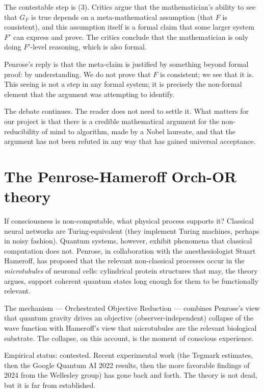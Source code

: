 \documentclass[11pt,a4paper]{book}
\theoremstyle{cleanrm}
\begin{document}
The contestable step is (3). Critics argue that the mathematician's
ability to see that $G_F$ is true depends on a meta-mathematical
assumption (that $F$ is consistent), and this assumption itself is
a formal claim that some larger system $F'$ can express and prove.
The critics conclude that the mathematician is only doing $F'$-level
reasoning, which is also formal.

Penrose's reply is that the meta-claim is justified by something
beyond formal proof: by understanding. We do not prove that $F$ is
consistent; we see that it is. This seeing is not a step in any
formal system; it is precisely the non-formal element that the
argument was attempting to identify.

The debate continues. The reader does not need to settle it. What
matters for our project is that there is a credible mathematical
argument for the non-reducibility of mind to algorithm, made by a
Nobel laureate, and that the argument has not been refuted in any
way that has gained universal acceptance.

\section{The Penrose-Hameroff Orch-OR theory}

If consciousness is non-computable, what physical process supports
it? Classical neural networks are Turing-equivalent (they implement
Turing machines, perhaps in noisy fashion). Quantum systems, however,
exhibit phenomena that classical computation does not. Penrose, in
collaboration with the anesthesiologist Stuart Hameroff, has proposed
that the relevant non-classical processes occur in the
\emph{microtubules} of neuronal cells: cylindrical protein structures
that may, the theory argues, support coherent quantum states long
enough for them to be functionally relevant.

The mechanism --- Orchestrated Objective Reduction --- combines
Penrose's view that quantum gravity drives an objective
(observer-independent) collapse of the wave function with Hameroff's
view that microtubules are the relevant biological substrate. The
collapse, on this account, is the moment of conscious experience.

Empirical status: contested. Recent experimental work (the Tegmark
estimates, then the Google Quantum AI 2022 results, then the more
favorable findings of 2024 from the Wellesley group) has gone back
and forth. The theory is not dead, but it is far from established.
\end{document}
